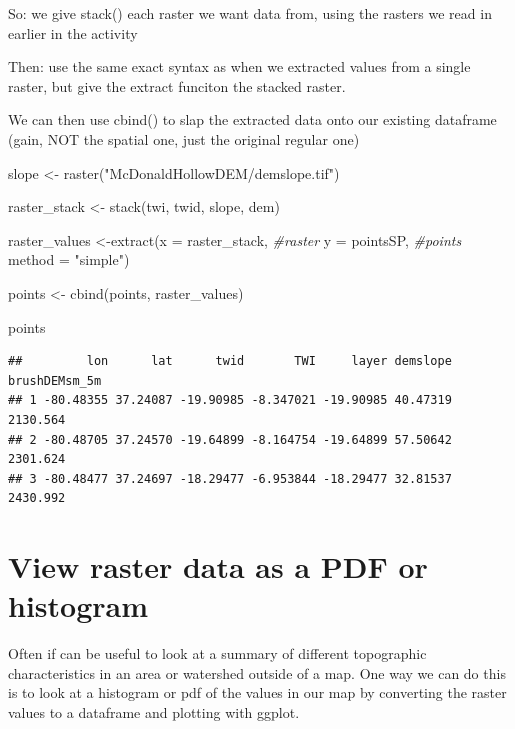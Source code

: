 \documentclass[
]{book}
\newenvironment{Shaded}{\begin{snugshade}}{\end{snugshade}}
\newcommand{\AttributeTok}[1]{\textcolor[rgb]{0.77,0.63,0.00}{#1}}
\newcommand{\CommentTok}[1]{\textcolor[rgb]{0.56,0.35,0.01}{\textit{#1}}}
\newcommand{\FunctionTok}[1]{\textcolor[rgb]{0.00,0.00,0.00}{#1}}
\newcommand{\NormalTok}[1]{#1}
\newcommand{\OtherTok}[1]{\textcolor[rgb]{0.56,0.35,0.01}{#1}}
\newcommand{\StringTok}[1]{\textcolor[rgb]{0.31,0.60,0.02}{#1}}
\begin{document}
So: we give stack() each raster we want data from, using the rasters we read in earlier in the activity

Then: use the same exact syntax as when we extracted values from a single raster, but give the extract funciton the stacked raster.

We can then use cbind() to slap the extracted data onto our existing dataframe (gain, NOT the spatial one, just the original regular one)

\begin{Shaded}
\begin{Highlighting}[]
\NormalTok{slope }\OtherTok{\textless{}{-}} \FunctionTok{raster}\NormalTok{(}\StringTok{"McDonaldHollowDEM/demslope.tif"}\NormalTok{)}

\NormalTok{raster\_stack }\OtherTok{\textless{}{-}} \FunctionTok{stack}\NormalTok{(twi, twid, slope, dem)}

\NormalTok{raster\_values }\OtherTok{\textless{}{-}}\FunctionTok{extract}\NormalTok{(}\AttributeTok{x =}\NormalTok{ raster\_stack, }\CommentTok{\#raster }
                 \AttributeTok{y =}\NormalTok{ pointsSP, }\CommentTok{\#points}
                 \AttributeTok{method =} \StringTok{"simple"}\NormalTok{)}

\NormalTok{points }\OtherTok{\textless{}{-}} \FunctionTok{cbind}\NormalTok{(points, raster\_values)}

\NormalTok{points}
\end{Highlighting}
\end{Shaded}

\begin{verbatim}
##         lon      lat      twid       TWI     layer demslope brushDEMsm_5m
## 1 -80.48355 37.24087 -19.90985 -8.347021 -19.90985 40.47319      2130.564
## 2 -80.48705 37.24570 -19.64899 -8.164754 -19.64899 57.50642      2301.624
## 3 -80.48477 37.24697 -18.29477 -6.953844 -18.29477 32.81537      2430.992
\end{verbatim}

\hypertarget{view-raster-data-as-a-pdf-or-histogram}{%
\section{View raster data as a PDF or histogram}\label{view-raster-data-as-a-pdf-or-histogram}}

Often if can be useful to look at a summary of different topographic characteristics in an area or watershed outside of a map. One way we can do this is to look at a histogram or pdf of the values in our map by converting the raster values to a dataframe and plotting with ggplot.
\end{document}
